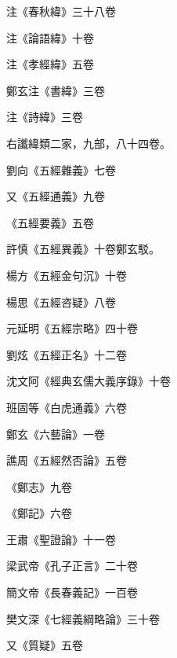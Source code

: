 \begin{pinyinscope}
 注《春秋緯》三十八卷



 注《論語緯》十卷



 注《孝經緯》五卷



 鄭玄注《書緯》三卷



 注《詩緯》三卷



 右讖緯類二家，九部，八十四卷。



 劉向《五經雜義》七卷



 又《五經通義》九卷



 《五經要義》五卷



 許慎《五經異義》十卷鄭玄駁。



 楊方《五經金句沉》十卷



 楊思《五經咨疑》八卷



 元延明《五經宗略》四十卷



 劉炫《五經正名》十二卷



 沈文阿《經典玄儒大義序錄》十卷



 班固等《白虎通義》六卷



 鄭玄《六藝論》一卷



 譙周《五經然否論》五卷



 《鄭志》九卷



 《鄭記》六卷



 王肅《聖證論》十一卷



 梁武帝《孔子正言》二十卷



 簡文帝《長春義記》一百卷



 樊文深《七經義綱略論》三十卷



 又《質疑》五卷




\end{pinyinscope}
